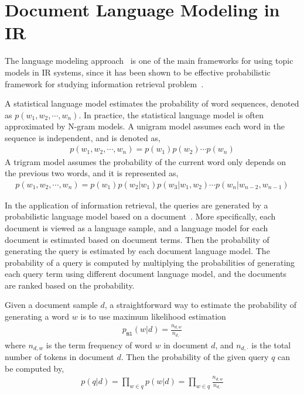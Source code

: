
\section{Document Language Modeling in IR}
\label{sec:ir-lm}

The language modeling approach~\citep{croft-03,PonteCroft,song-99} is
one of the main frameworks for using topic models in IR systems, since
it has been shown to be effective probabilistic framework for studying
information retrieval problem~\citep{PonteCroft,berger-99}.

A statistical language model estimates the probability of word
sequences, denoted as $p(w_1,w_2,\cdots,w_n)$. In practice, the
statistical language model is often approximated by N-gram models. A
unigram model assumes each word in the sequence is independent, and is
denoted as,
\begin{align}
p(w_1,w_2,\cdots,w_n) = p(w_1)p(w_2) \cdots p(w_n)
\end{align}
A trigram model assumes the probability of the current word only
depends on the previous two words, and it is represented as,
\begin{align}
p(w_1,w_2,\cdots,w_n)=p(w_1)p(w_2|w_1)p(w_3|w_1,w_2)\cdots p(w_n|w_{n-2},w_{n-1})
\end{align}


In the application of information retrieval, the queries are generated
by a probabilistic language model based on a
document~\citep{zhai-01}. More specifically, each document is viewed
as a language sample, and a language model for each document is
estimated based on document terms. Then the probability of generating
the query is estimated by each document language model. The
probability of a query is computed by multiplying the probabilities of
generating each query term using different document language model,
and the documents are ranked based on the probability.

Given a document sample $d$, a straightforward way to estimate the
probability of generating a word $w$ is to use maximum likelihood
estimation
\begin{align}
p_{\texttt{ml}}(w|d) = \frac{n_{d,w}}{n_{d,\cdot}}
\label{eq:ir_mse}
\end{align}
where $n_{d,w}$ is the term frequency of word $w$ in document $d$, and
$n_{d,\cdot}$ is the total number of tokens in document $d$. Then the
probability of the given query $q$ can be computed by,
\begin{align}
p(q|d) = \prod_{w \in q} p(w|d) = \prod_{w \in q} \frac{n_{d,w}}{n_{d,\cdot}}
\end{align}

